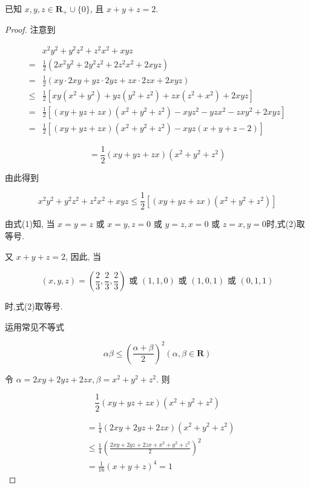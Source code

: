 \begin{example}
	已知 $x, y, z \in \mathbf{R}_{+} \cup\{0\}$, 且 $x+y+z=2$.
\end{example}
\begin{proof}
	注意到
	
	
	\begin{align*}
	& x^{2} y^{2}+y^{2} z^{2}+z^{2} x^{2}+x y z \\
	= & \frac{1}{2}\left(2 x^{2} y^{2}+2 y^{2} z^{2}+2 z^{2} x^{2}+2 x y z\right) \\
	= & \frac{1}{2}(x y \cdot 2 x y+y z \cdot 2 y z+z x \cdot 2 z x+2 x y z) \\
	\leqslant & \frac{1}{2}\left[x y\left(x^{2}+y^{2}\right)+y z\left(y^{2}+z^{2}\right)+z x\left(z^{2}+x^{2}\right)+2 x y z\right]  \tag{1}\\
	= & \frac{1}{2}\left[(x y+y z+z x)\left(x^{2}+y^{2}+z^{2}\right)-x y z^{2}-y z x^{2}-z x y^{2}+2 x y z\right] \\
	= & \frac{1}{2}\left[(x y+y z+z x)\left(x^{2}+y^{2}+z^{2}\right)-x y z(x+y+z-2)\right]
	\end{align*}
	
	
	$$
	=\frac{1}{2}(x y+y z+z x)\left(x^{2}+y^{2}+z^{2}\right)
	$$
	
	由此得到
	
	
	\begin{equation*}
	x^{2} y^{2}+y^{2} z^{2}+z^{2} x^{2}+x y z \leqslant \frac{1}{2}\left[(x y+y z+z x)\left(x^{2}+y^{2}+z^{2}\right)\right] \tag{2}
	\end{equation*}
	
	
	由式(1)知, 当 $x=y=z$ 或 $x=y, z=0$ 或 $y=z, x=0$ 或 $z=x, y=0$时,式(2)取等号.
	
	又 $x+y+z=2$, 因此, 当
	
	$$
	(x, y, z)=\left(\frac{2}{3}, \frac{2}{3}, \frac{2}{3}\right) \text { 或 }(1,1,0) \text { 或 }(1,0,1) \text { 或 }(0,1,1)
	$$
	
	时,式(2)取等号.
	
	运用常见不等式
	
	$$
	\alpha \beta \leqslant\left(\frac{\alpha+\beta}{2}\right)^{2}(\alpha, \beta \in \mathbf{R})
	$$
	
	令 $\alpha=2 x y+2 y z+2 z x, \beta=x^{2}+y^{2}+z^{2}$. 则
	
	$$
	\frac{1}{2}(x y+y z+z x)\left(x^{2}+y^{2}+z^{2}\right)
	$$
	
	
	\begin{align*}
	& =\frac{1}{4}(2 x y+2 y z+2 z x)\left(x^{2}+y^{2}+z^{2}\right) \\
	& \leqslant \frac{1}{4}\left(\frac{2 x y+2 y z+2 z x+x^{2}+y^{2}+z^{2}}{2}\right)^{2} \\
	& =\frac{1}{16}(x+y+z)^{4}=1 \tag{3}
	\end{align*}
	

\end{proof}
